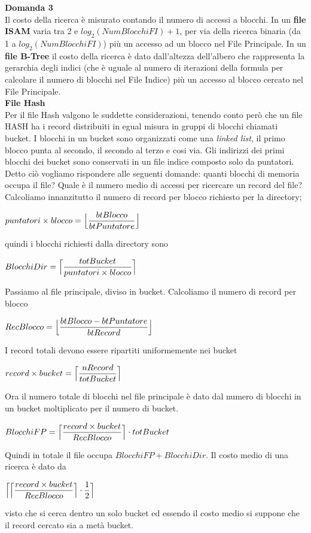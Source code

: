   \noindent\textbf{\fontsize{14pt}{1em}Domanda 3}\\
  Il costo della ricerca è misurato contando il numero di accessi a blocchi. In un \textbf{file ISAM} varia tra 2 e 
  $log_2(NumBlocchiFI) + 1$, per via della ricerca binaria (da 1 a $log_2(NumBlocchiFI)$) più un accesso ad un blocco
  nel File Principale. In un \textbf{file B-Tree} il costo della ricerca è dato dall'altezza dell'albero che rappresenta
  la gerarchia degli indici (che è uguale al numero di iterazioni della formula per calcolare il 
  numero di blocchi nel File Indice) più un accesso al blocco cercato nel File Principale.\\
  
  \noindent\textbf{\fontsize{16pt}{1em}File Hash}\\
  Per il file Hash valgono le suddette considerazioni, tenendo conto però che un file HASH ha i record distribuiti in egual misura
  in gruppi di blocchi chiamati bucket. I blocchi in un bucket sono organizzati come una \emph{linked list}, il primo blocco punta al
  secondo, il secondo al terzo e cosi via. Gli indirizzi dei primi blocchi dei bucket sono conservati in un file indice composto solo
  da puntatori. Detto ciò vogliamo rispondere alle seguenti domande: quanti blocchi di
  memoria occupa il file? Quale è il numero medio di accessi per ricercare un record del file?\\
  
Calcoliamo innanzitutto il numero di record per blocco richiesto per la directory; 
\begin{center}
 $puntatori \times blocco = \Bigl\lfloor \dfrac{btBlocco}{btPuntatore} \Bigr\rfloor$
\end{center}
quindi i blocchi richiesti dalla directory sono
\begin{center}
 $BlocchiDir = \Bigl\lceil \dfrac{totBucket}{puntatori \times blocco} \Bigr\rceil$
\end{center}
Passiamo al file principale, diviso in bucket. Calcoliamo il numero di record per blocco
\begin{center}
 $RecBlocco = \Bigl\lfloor \dfrac{btBlocco-btPuntatore}{btRecord} \Bigr\rfloor$
\end{center}
I record totali devono essere ripartiti uniformemente nei bucket
\begin{center}
 $record \times bucket = \Bigl\lceil \dfrac{nRecord}{totBucket} \Bigr\rceil$
\end{center}
Ora il numero totale di blocchi nel file principale è dato dal numero di blocchi in un bucket
moltiplicato per il numero di bucket.
\begin{center}
 $BlocchiFP = \Bigl\lceil \dfrac{record \times bucket}{RecBlocco} \Bigr\rceil \cdot totBucket$
\end{center}
Quindi in totale il file occupa $BlocchiFP + BlocchiDir$. Il costo medio di 
una ricerca è dato da
\begin{center}
 $\Bigl\lceil \Bigl\lceil \dfrac{record \times bucket}{RecBlocco} \Bigr\rceil \cdot \dfrac{1}{2} \Bigr\rceil$
\end{center}
visto che si cerca dentro un solo bucket ed essendo il costo medio si suppone che il record
cercato sia a metà bucket.

